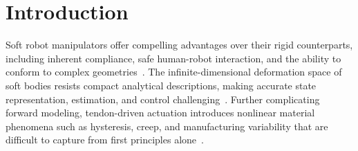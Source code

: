 \documentclass[letterpaper, 10 pt, conference]{ieeeconf}  %
\begin{document}











\section{Introduction}


Soft robot manipulators offer compelling advantages over their rigid counterparts, including inherent compliance, safe human-robot interaction, and the ability to conform to complex geometries~\cite{abondance2020dexterous}. The infinite-dimensional deformation space of soft bodies resists compact analytical descriptions, making accurate state representation, estimation, and control challenging~\cite{polygerinos_soft_2017}. Further complicating forward modeling, tendon-driven actuation introduces nonlinear material phenomena such as hysteresis, creep, and manufacturing variability that are difficult to capture from first principles alone~\cite{polygerinos_soft_2017}.

\end{document}

